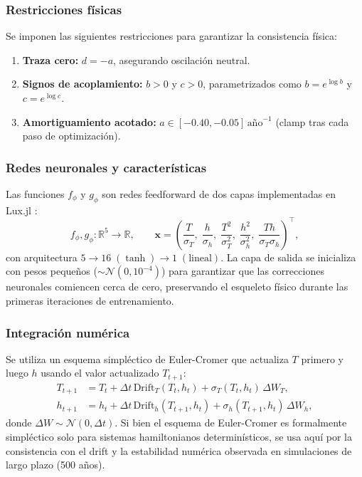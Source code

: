 \documentclass[11pt,a4paper]{article}
\newcommand{\R}{\mathbb{R}}
\newcommand{\Dt}{\Delta t}
\begin{document}
\subsubsection{Restricciones físicas}

Se imponen las siguientes restricciones para garantizar la consistencia física:
\begin{enumerate}[label=(\alph*)]
  \item \textbf{Traza cero:} $d = -a$, asegurando oscilación neutral.
  \item \textbf{Signos de acoplamiento:} $b > 0$ y $c > 0$, parametrizados como $b = e^{\log b}$ y $c = e^{\log c}$.
  \item \textbf{Amortiguamiento acotado:} $a \in [-0.40, -0.05]\,\text{año}^{-1}$ (clamp tras cada paso de optimización).
\end{enumerate}

\subsubsection{Redes neuronales y características}

Las funciones $f_\phi$ y $g_\phi$ son redes feedforward de dos capas implementadas en Lux.jl \citep{lux2022}:
\begin{equation}
f_\phi, g_\phi: \R^5 \to \R, \qquad
\mathbf{x} = \left(\frac{T}{\sigma_T},\; \frac{h}{\sigma_h},\; \frac{T^2}{\sigma_T^2},\; \frac{h^2}{\sigma_h^2},\; \frac{Th}{\sigma_T \sigma_h}\right)^{\!\top},
\end{equation}
con arquitectura $5 \to 16\;(\tanh) \to 1\;(\text{lineal})$. La capa de salida se inicializa con pesos pequeños (${\sim \mathcal{N}(0, 10^{-4})}$) para garantizar que las correcciones neuronales comiencen cerca de cero, preservando el esqueleto físico durante las primeras iteraciones de entrenamiento.



\subsubsection{Integración numérica}

Se utiliza un esquema simpléctico de Euler-Cromer \citep{cromer1981} que actualiza $T$ primero y luego $h$ usando el valor actualizado $T_{t+1}$:
\begin{align}
T_{t+1} &= T_t + \Dt\,\text{Drift}_T(T_t, h_t) + \sigma_T(T_t, h_t)\,\Delta W_T, \label{eq:euler_T}\\
h_{t+1} &= h_t + \Dt\,\text{Drift}_h(T_{t+1}, h_t) + \sigma_h(T_{t+1}, h_t)\,\Delta W_h, \label{eq:euler_h}
\end{align}
donde $\Delta W \sim \mathcal{N}(0, \Dt)$. Si bien el esquema de Euler-Cromer es formalmente simpléctico solo para sistemas hamiltonianos determinísticos, se usa aquí por la consistencia con el drift y la estabilidad numérica observada en simulaciones de largo plazo (500 años).
\end{document}
